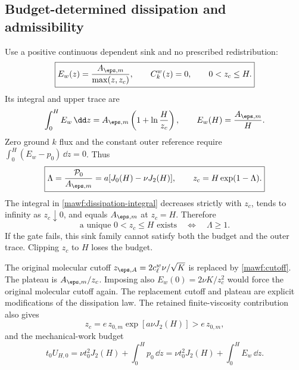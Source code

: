 \subsection{Budget-determined dissipation and admissibility}
\label{mawf:cutoff-section}
Use a positive continuous dependent sink and no prescribed redistribution:
\begin{equation}
 \boxed{E_w(z)=\frac{A_{\eps,m}}{\max(z,z_c)},\qquad
 C_k^w(z)=0,\qquad 0<z_c\le H.}
 \label{mawf:dissipation}
\end{equation}
Its integral and upper trace are
\begin{equation}
 \int_0^HE_w\,\dd z=A_{\eps,m}\left(1+\ln\frac H{z_c}\right),
 \qquad E_w(H)=\frac{A_{\eps,m}}H.
 \label{mawf:dissipation-integral}
\end{equation}
Zero ground \(k\) flux and the constant outer reference require
\(\int_0^H(E_w-p_0)\,\dd z=0\). Thus
\begin{equation}
 \boxed{\Lambda=\frac{\mathcal P_0}{A_{\eps,m}}
       =a[J_0(H)-\nu J_2(H)],\qquad
 z_c=H\exp(1-\Lambda).}
 \label{mawf:cutoff}
\end{equation}
The integral in \cref{mawf:dissipation-integral} decreases strictly
with \(z_c\), tends to infinity as \(z_c\downarrow0\), and equals
\(A_{\eps,m}\) at \(z_c=H\). Therefore
\begin{equation}
 \boxed{\text{a unique }0<z_c\le H\text{ exists}
        \quad\Longleftrightarrow\quad \Lambda\ge1.}
 \label{mawf:gate}
\end{equation}
If the gate fails, this sink family cannot satisfy both the budget
and the outer trace. Clipping \(z_c\) to \(H\) loses the budget.

The original molecular cutoff
\(z_{\eps,A}=2c_\ell^w\nu/\sqrt K\) is replaced by
\cref{mawf:cutoff}. The plateau is \(A_{\eps,m}/z_c\).
Imposing also \(E_w(0)=2\nu K/z_c^2\) would force the original
molecular cutoff again. The replacement cutoff and plateau are
explicit modifications of the dissipation law.
The retained finite-viscosity contribution also gives
\begin{equation}
 \boxed{z_c=e\,z_{0,m}\exp[a\nu J_2(H)]>e\,z_{0,m},}
 \label{mawf:cutoff-z0}
\end{equation}
and the mechanical-work budget
\begin{equation}
 t_0U_{H,0}
 =\nu t_0^2J_2(H)+\int_0^Hp_0\,\dd z
 =\nu t_0^2J_2(H)+\int_0^HE_w\,\dd z.
 \label{mawf:work}
\end{equation}

